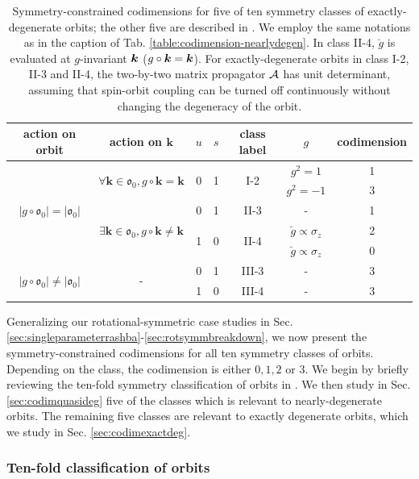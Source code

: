 \documentclass[aps, showpacs, twocolumn, notitlepage, superscriptaddress]{revtex4-1}
\begin{document}
\begin{table}
\begin{tabular}{|c|c|c|c|c|c|c|}
\hline 
action on orbit  & action on $\boldsymbol{k}$  & $u$ & $s$  & class label & $g$  & codimension\tabularnewline
\hline 
\multirow{5}{*}{$|g\circ\mathfrak{o}_{0}|=|\mathfrak{o}_{0}|$} & \multirow{2}{*}{$\forall\boldsymbol{k}\in\mathfrak{o}_{0},g\circ\boldsymbol{k}=\boldsymbol{k}$} & \multirow{2}{*}{0} & \multirow{2}{*}{1} & \multirow{2}{*}{I-2} & $g^{2}=1$  & 1\tabularnewline
\cline{6-7} 
 &  &  &  &  & $g^{2}=-1$  & 3\tabularnewline
\cline{2-7} 
 & \multirow{3}{*}{$\exists\boldsymbol{k}\in\mathfrak{o}_{0},g\circ\boldsymbol{k}\neq\boldsymbol{k}$} & 0 & 1 & II-3 & - & 1\tabularnewline
\cline{3-7} 
 &  & \multirow{2}{*}{1} & \multirow{2}{*}{0} & \multirow{2}{*}{II-4} & $\breve{g}\propto\sigma_{z}$  & 2\tabularnewline
\cline{6-7} 
 &  &  &  &  & $\breve{g}\propto\sigma_{z}$  & 0\tabularnewline
\hline 
\multirow{2}{*}{$|g\circ\mathfrak{o}_{0}|\neq|\mathfrak{o}_{0}|$ } & \multirow{2}{*}{-} & 0 & 1 & III-3 & - & 3\tabularnewline
\cline{3-7} 
 &  & 1 & 0 & III-4 & - & 3\tabularnewline
\hline 
\end{tabular}
\caption{Symmetry-constrained codimensions for five of ten symmetry classes of exactly-degenerate orbits; the other five are described in . We employ the same notations as in the caption of Tab. \ref{table:codimension-nearlydegen}. In class II-4, $\breve g$ is evaluated at $g$-invariant $\boldsymbol{k}$ ($g\circ\boldsymbol{k}=\boldsymbol{k}$). For exactly-degenerate orbits in class I-2, II-3 and II-4, the two-by-two matrix propagator ${\cal A}$ has unit determinant, assuming that spin-orbit coupling can be turned off continuously without changing the degeneracy of the orbit.\cite{topoferm}\label{table:codimension-exactlydegen}}
\end{table}

Generalizing our rotational-symmetric case studies in
Sec. \ref{sec:singleparameterrashba}-\ref{sec:rotsymmbreakdown}, we now present the symmetry-constrained codimensions for all ten symmetry classes of orbits\cite{topoferm}. Depending on the class, the codimension is either $0,1,2$ or $3$. We begin by briefly reviewing the ten-fold symmetry classification of orbits in . We then study in Sec. \ref{sec:codimquasideg} five of the classes which is relevant to nearly-degenerate orbits. The remaining five classes are relevant to exactly degenerate orbits, which we study in Sec. \ref{sec:codimexactdeg}.

\subsubsection{Ten-fold classification of orbits}\label{sec:reviewtenfold}
\end{document}
